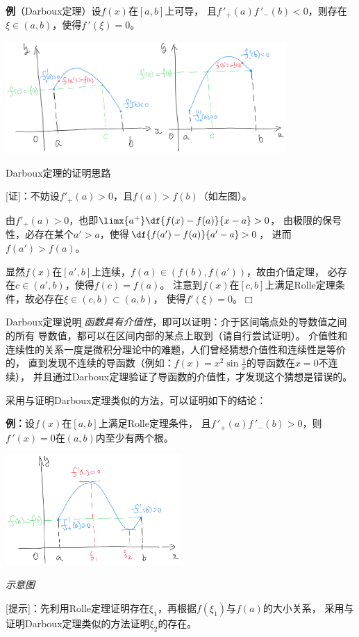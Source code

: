 \begin{shaded}

	{\bf 例}（{\kaishu Darboux定理}）设$f(x)$在$[a,b]$上可导，
	且$f\,'_+(a)f\,'_-(b)<0$，则存在$\xi\in(a,b)$，使得$f\,'(\xi)=0$。
	
	\begin{center}
		\includegraphics[width=0.8\textwidth]{./images/ch3/Darboux.jpg}
		
		\kaishu Darboux定理的证明思路
	\end{center}
	
	[证]：不妨设$f'_+(a)>0$，且$f(a)>f(b)$（如左图）。
	
	由$f'_+(a)>0$，也即$\limx{a^+}\df{f(x)-f(a)}{x-a}>0$，
	由极限的保号性，必存在某个$a'>a$，使得$\df{f(a')-f(a)}{a'-a}>0$，
	进而$f(a')>f(a)$。
	
	显然$f(x)$在$[a',b]$上连续，$f(a)\in(f(b),f(a'))$，故由介值定理，
	必存在$c\in(a',b)$，使得$f(c)=f(a)$。
	注意到$f(x)$在$[c,b]$上满足Rolle定理条件，故必存在$\xi\in(c,b)\subset(a,b)$，
	使得$f'(\xi)=0$。\hfill$\Box$
	
	Darboux定理说明{\it\b 导函数具有介值性}，即可以证明：介于区间端点处的导数值之间的所有
	导数值，都可以在区间内部的某点上取到（请自行尝试证明）。
	介值性和连续性的关系一度是微积分理论中的难题，人们曾经猜想介值性和连续性是等价的，
	直到发现不连续的导函数（例如：$f(x)=x^2\sin\frac1x$的导函数在$x=0$不连续），
	并且通过Darboux定理验证了导函数的介值性，才发现这个猜想是错误的。
	
	采用与证明Darboux定理类似的方法，可以证明如下的结论：
	
	{\bf 例：}设$f(x)$在$[a,b]$上满足Rolle定理条件，
	且$f\,'_+(a)f\,'_-(b)>0$，则$f\,'(x)=0$在$(a,b)$内至少有两个根。
	
	\begin{center}
		\includegraphics[width=0.5\textwidth]{./images/ch3/Darboux2.jpg}
		
		\it 示意图
	\end{center}
	
	[提示]：先利用Rolle定理证明存在$\xi_1$，再根据$f(\xi_1)$与$f(a)$的大小关系，
	采用与证明Darboux定理类似的方法证明$\xi_2$的存在。
\end{shaded}

